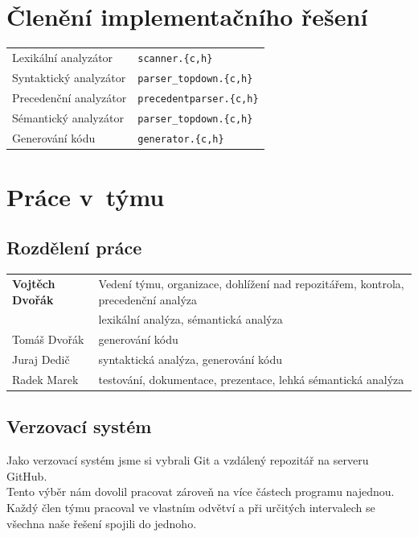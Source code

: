 \documentclass[11pt]{article}
\begin{document}
    \section{Členění implementačního řešení}
        \begin{tabular}{l l}
            Lexikální analyzátor & \; \verb|scanner.{c,h}| \\
            Syntaktický analyzátor & \; \verb|parser_topdown.{c,h}| \\ 
            Precedenční analyzátor & \; \verb|precedentparser.{c,h}| \\
            Sémantický analyzátor & \; \verb|parser_topdown.{c,h}| \\
            Generování kódu & \; \verb|generator.{c,h}|
        \end{tabular}
    \vspace{10mm}
    \section{Práce v~týmu}
    
    \subsection{Rozdělení práce}
        \begin{tabular}{l  l}
                \textbf{Vojtěch Dvořák} & Vedení týmu, organizace, dohlížení nad repozitářem, kontrola,             precedenční analýza  \\
                        & lexikální analýza, sémantická analýza\\
                Tomáš Dvořák & generování kódu   \\
                Juraj Dedič & syntaktická analýza, generování kódu \\
                Radek Marek & testování, dokumentace, prezentace, lehká sémantická analýza 
        \end{tabular}
    
    \subsection{Verzovací systém}
        Jako verzovací systém jsme si vybrali Git a vzdálený repozitář na serveru GitHub. \\
    	\indent Tento výběr nám dovolil pracovat zároveň na více částech programu najednou. Každý člen týmu pracoval ve vlastním odvětví a při určitých intervalech se všechna naše řešení spojili do jednoho. 
\end{document}
